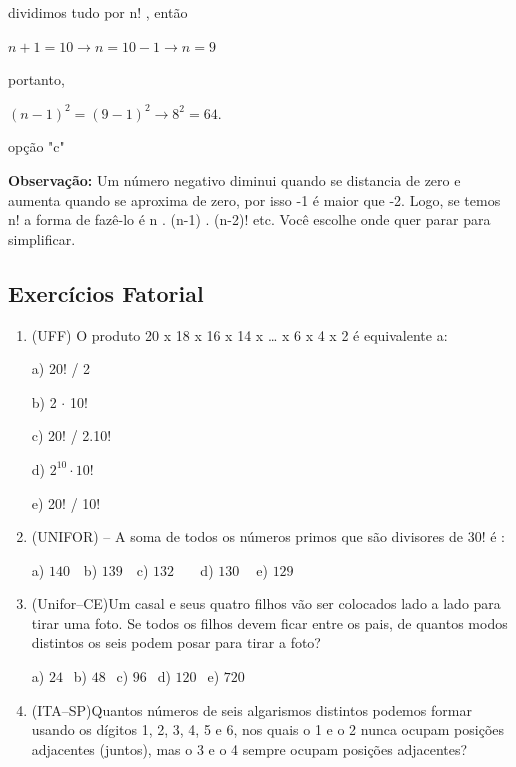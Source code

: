 \begin{multicols*}{2}
\begin{enumerate}
\begin{enumerate}
                        dividimos tudo por n! , então

                        $n + 1 = 10 \to n = 10 - 1 \to n = 9$

                        portanto,

                        $(n - 1)^2 = (9 - 1)^2 \to 8^2 = 64$.

                        opção "c"

              \end{enumerate}

              \textbf{Observação:} Um número negativo diminui quando se distancia de zero e aumenta quando se aproxima de zero, por isso -1 é maior que -2. Logo, se temos n! a forma de fazê-lo é n . (n-1) . (n-2)! etc. Você escolhe onde quer parar para simplificar.

    \end{enumerate}


    \subsection{Exercícios Fatorial}

    \begin{enumerate}

        \item  (UFF) O produto 20 x 18 x 16 x 14 x … x 6 x 4 x 2 é equivalente a:

              a) 20! / 2

              b) 2 $\cdot$ 10!

              c) 20! / 2.10!

              d) $2^{10} \cdot 10!$

              e) 20! / 10!

        \item  (UNIFOR) – A soma de todos os números primos que são divisores de 30! é :

              a) $140 \ \ \ $ b) $139 \ \ \ $ c) $132 \ \ \ \ \ \ \ $ d) $130 \ \ \ \ $ e) $129 \ \ $

        \item  (Unifor–CE)Um casal e seus quatro filhos vão ser colocados lado a lado para tirar uma foto. Se todos os filhos devem ficar entre os pais, de quantos modos distintos os seis podem posar para tirar a foto?

              a) $24 \ \ $ b) $48 \ \ $ c) $96 \ \ $ d) $120 \ \ $ e) $720 \ \ $

        \item  (ITA–SP)Quantos números de seis algarismos distintos podemos formar usando os dígitos 1, 2, 3, 4, 5 e 6, nos quais o 1 e o 2 nunca ocupam posições adjacentes (juntos), mas o 3 e o 4 sempre ocupam posições adjacentes?


\end{enumerate}
\end{multicols*}
